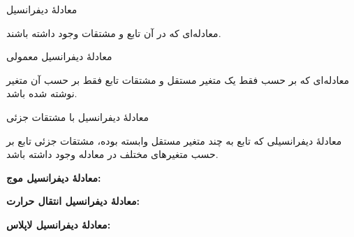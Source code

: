 \EMhold


\begin{EMdefinition}{معادلهٔ دیفرانسیل}

معادله‌ای که در آن تابع و مشتقات وجود داشته باشند.

\end{EMdefinition}

\begin{EMdefinition}{معادلهٔ دیفرانسیل معمولی}

معادله‌ای که بر حسب فقط یک متغیر مستقل و مشتقات تابع فقط بر حسب آن متغیر نوشته شده باشد.

\end{EMdefinition}

\begin{EMdefinition}{معادلهٔ دیفرانسیل با مشتقات جزئی}

معادلهٔ دیفرانسیلی که تابع به چند متغیر مستقل وابسته بوده، مشتقات جزئی تابع بر حسب متغیرهای مختلف در معادله وجود داشته باشد.

\end{EMdefinition}

\begin{EMunit}

\textbf{معادلهٔ دیفرانسیل موج:}

\textbf{معادلهٔ دیفرانسیل انتقال حرارت:}

\end{EMunit}

\textbf{معادلهٔ دیفرانسیل لاپلاس:}

